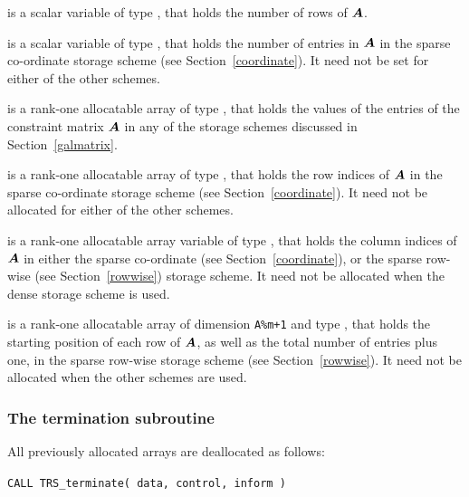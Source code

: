 \documentclass{galahad}
\newcommand{\packagename}{TRS}
\begin{document}
\begin{description}
\begin{description}
 is a scalar variable of type \integer, that
holds the number of rows of ${\bm{A}}$.

 is a scalar variable of type \integer, that
holds the number of entries in ${\bm{A}}$
in the sparse co-ordinate storage scheme (see Section~\ref{coordinate}).
It need not be set for either of the other schemes.

 is a rank-one allocatable array of type \realdp, that holds
the values of the entries of the constraint matrix ${\bm{A}}$ in any of the
storage schemes discussed in Section~\ref{galmatrix}.

 is a rank-one allocatable array of type \integer,
that holds the row indices of ${\bm{A}}$ in the sparse co-ordinate storage
scheme (see Section~\ref{coordinate}).
It need not be allocated for either of the other schemes.

 is a rank-one allocatable array variable of type \integer,
that holds the column indices of ${\bm{A}}$ in either the sparse co-ordinate
(see Section~\ref{coordinate}), or the sparse row-wise
(see Section~\ref{rowwise}) storage scheme.
It need not be allocated when the dense storage scheme is used.

 is a rank-one allocatable array of dimension {\tt A\%m+1} and type
\integer, that holds the starting position of
each row of ${\bm{A}}$, as well
as the total number of entries plus one, in the sparse row-wise storage
scheme (see Section~\ref{rowwise}). It need not be allocated when the
other schemes are used.
\end{description}

\end{description}


\subsubsection{The  termination subroutine}
All previously allocated arrays are deallocated as follows:

\hskip0.5in
{\tt CALL \packagename\_terminate( data, control, inform )}
\end{document}
